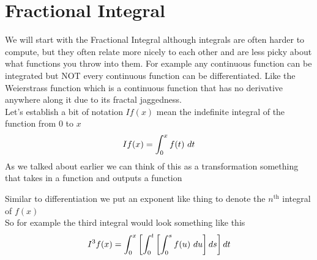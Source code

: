 \section{Fractional Integral}
We will start with the Fractional Integral although integrals are often harder to compute, 
but they often relate more nicely to each other and are less picky about what 
functions you throw into them. 
For example any continuous function can be integrated but NOT every continuous function can 
be differentiated. 
Like the Weierstrass function which is a continuous function that has no derivative anywhere along it due to its fractal jaggedness.
\\
Let's establish a bit of notation $If(x)$ mean the indefinite integral of the function from 0 to $x$
\[
If(x) = \int_{0}^{x} f(t) \,\, dt
\]
As we talked about earlier we can think of this as a transformation something that takes in a function and outputs a function
\begin{center}
\end{center}
Similar to differentiation we put an exponent like thing to denote the $ n^{\text{th}} $ integral of $f(x)$ 
\\
So for example the third integral would look something like this
\[
I^3 f(x) = \int_{0}^{x}\left[ \int_{0}^{t}\left[ \int_{0}^{s} f(u) \,\, du \right]ds \right]dt
\]
